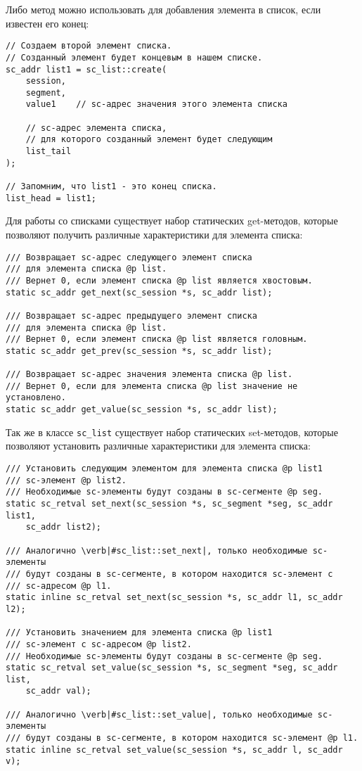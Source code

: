 Либо метод можно использовать для добавления элемента в список, если
известен его конец:
\begin{lstlisting}[texcl]
// Создаем второй элемент списка.
// Созданный элемент будет концевым в нашем списке.
sc_addr list1 = sc_list::create(
    session,
    segment,
    value1    // sc-адрес значения этого элемента списка

    // sc-адрес элемента списка,
    // для которого созданный элемент будет следующим
    list_tail
);

// Запомним, что list1 - это конец списка.
list_head = list1;
\end{lstlisting}

Для работы со списками существует набор статических get-методов,
которые позволяют получить различные характеристики для элемента
списка:
\begin{lstlisting}[texcl]
/// Возвращает sc-адрес следующего элемент списка
/// для элемента списка @p list.
/// Вернет 0, если элемент списка @p list является хвостовым.
static sc_addr get_next(sc_session *s, sc_addr list);

/// Возвращает sc-адрес предыдущего элемент списка
/// для элемента списка @p list.
/// Вернет 0, если элемент списка @p list является головным.
static sc_addr get_prev(sc_session *s, sc_addr list);

/// Возвращает sc-адрес значения элемента списка @p list.
/// Вернет 0, если для элемента списка @p list значение не установлено.
static sc_addr get_value(sc_session *s, sc_addr list);
\end{lstlisting}

Так же в классе \lstinline|sc_list| существует набор статических
set-методов, которые позволяют установить различные характеристики для
элемента списка:
\begin{lstlisting}[texcl]
/// Установить следующим элементом для элемента списка @p list1
/// sc-элемент @p list2.
/// Необходимые sc-элементы будут созданы в sc-сегменте @p seg.
static sc_retval set_next(sc_session *s, sc_segment *seg, sc_addr list1,
    sc_addr list2);

/// Аналогично \verb|#sc_list::set_next|, только необходимые sc-элементы
/// будут созданы в sc-сегменте, в котором находится sc-элемент c
/// sc-адресом @p l1.
static inline sc_retval set_next(sc_session *s, sc_addr l1, sc_addr l2);

/// Установить значением для элемента списка @p list1
/// sc-элемент с sс-адресом @p list2.
/// Необходимые sc-элементы будут созданы в sc-сегменте @p seg.
static sc_retval set_value(sc_session *s, sc_segment *seg, sc_addr list,
    sc_addr val);

/// Аналогично \verb|#sc_list::set_value|, только необходимые sc-элементы
/// будут созданы в sc-сегменте, в котором находится sc-элемент @p l1.
static inline sc_retval set_value(sc_session *s, sc_addr l, sc_addr v);
\end{lstlisting}

